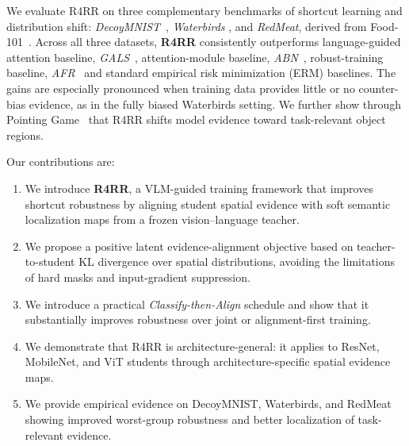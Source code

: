 


We evaluate R4RR on three complementary benchmarks of shortcut learning and distribution shift: \emph{DecoyMNIST}~\cite{erion2021improving}, \emph{Waterbirds} \cite{sagawa2019distributionally}, and \emph{RedMeat}, derived from Food-101~\cite{bossard2014food}. Across all three datasets, \textbf{R4RR} consistently outperforms language-guided attention baseline, \emph{GALS}~\cite{petryk2022guiding}, attention-module baseline, \emph{ABN}~\cite{fukui2019attention}, robust-training baseline, \emph{AFR}~\cite{qiu2023simple} and standard empirical risk minimization (ERM) baselines. The gains are especially pronounced when training data provides little or no counter-bias evidence, as in the fully biased Waterbirds setting. We further show through Pointing Game~\cite{zhang2018top} that R4RR shifts model evidence toward task-relevant object regions.

Our contributions are:
\begin{enumerate}
\item We introduce \textbf{R4RR}, a VLM-guided training framework that improves shortcut robustness by aligning student spatial evidence with soft semantic localization maps from a frozen vision--language teacher.
\item We propose a positive latent evidence-alignment objective based on teacher-to-student KL divergence over spatial distributions, avoiding the limitations of hard masks and input-gradient suppression.
\item We introduce a practical \emph{Classify-then-Align} schedule and show that it substantially improves robustness over joint or alignment-first training.
\item We demonstrate that R4RR is architecture-general: it applies to ResNet, MobileNet, and ViT students through architecture-specific spatial evidence maps.
\item We provide empirical evidence on DecoyMNIST, Waterbirds, and RedMeat showing improved worst-group robustness and better localization of task-relevant evidence.
\end{enumerate}

